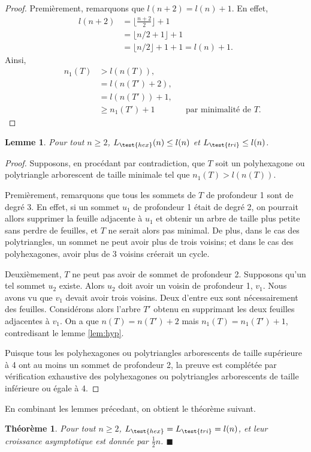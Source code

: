 \documentclass{article}
\newtheorem{thm}{Théorème}[section]
\newtheorem{lem}{Lemme}[section]
\theoremstyle{definition}
\newcommand{\Lhex}{L_{\test{hex}}}
\newcommand{\Ltri}{L_{\test{tri}}}
\begin{document}
\begin{proof}
   Premièrement, remarquons que $l(n + 2) = l(n) + 1$. En effet,
   \begin{align*}
      l(n+2) &= \lfloor \frac{n+2}{2} \rfloor + 1 \\
             &= \lfloor n/2 + 1 \rfloor + 1 \\
             &= \lfloor n/2 \rfloor + 1 + 1 = l(n) + 1.
   \end{align*}
   Ainsi,
   \begin{align*}
      && n_1(T) &> l(n(T)), && \\
      &&      &= l(n(T') + 2), && \\
      &&       &= l(n(T')) + 1, &&  \\
      &&       &\geq n_1(T') + 1 && \text{par minimalité de $T$.}
   \end{align*}
\end{proof}

\begin{lem}
   Pour tout $n \geq 2$, $\Lhex(n) \leq l(n)$ et $\Ltri \leq l(n)$.
\end{lem}

\begin{proof}
   Supposons, en procédant par contradiction, que $T$ soit un
   polyhexagone ou polytriangle arborescent de taille minimale 
   tel que $n_1(T) > l(n(T))$.

   Premièrement, remarquons que tous les sommets de $T$ de profondeur 
   1 sont de degré 3. En effet, si un sommet $u_1$ de profondeur 1 
   était de degré 2, on pourrait allors supprimer la feuille adjacente 
   à $u_1$ et obtenir un arbre de taille plus petite sans perdre 
   de feuilles, et $T$ ne serait alors pas minimal. De plus, dans 
   le cas des polytriangles, un sommet ne peut avoir plus de trois
   voisins; et dans le cas des polyhexagones, avoir plus de 3 voisins
   créerait un cycle.

   Deuxièmement, $T$ ne peut pas avoir de sommet de profondeur 2. Supposons qu'un tel sommet $u_2$ existe. Alors $u_2$ doit avoir un voisin de profondeur 1, $v_1$. Nous avons vu que $v_1$ devait avoir trois voisins. Deux d'entre eux sont nécessairement des feuilles. Considérons alors l'arbre $T'$ obtenu en supprimant les deux feuilles adjacentes à $v_1$. On a que $n(T) = n(T') + 2$ mais $n_1(T) = n_1(T') + 1$, contredisant le lemme \ref{lem:hyp}.

   Puisque tous les polyhexagones ou polytriangles arborescents de taille supérieure à 4 ont au moins un sommet de profondeur 2, la preuve est complétée par vérification exhaustive des polyhexagones ou polytriangles arborescents de taille inférieure ou égale à 4.
\end{proof}

En combinant les lemmes précedant, on obtient le théorème suivant.

\begin{thm}
   Pour tout $n \geq 2$, $\Lhex = \Ltri = l(n)$, et leur croissance
   asymptotique est donnée par $\frac{1}{2}n$. \hfill $\blacksquare$
\end{thm}
\end{document}
